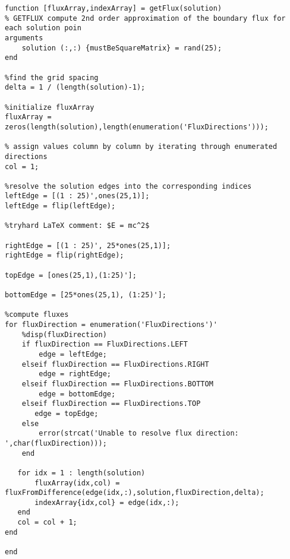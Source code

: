 \documentclass[twocolumn]{article}
\begin{document}
\begin{verbatim}
function [fluxArray,indexArray] = getFlux(solution)
% GETFLUX compute 2nd order approximation of the boundary flux for each solution poin
arguments
    solution (:,:) {mustBeSquareMatrix} = rand(25);
end

%find the grid spacing
delta = 1 / (length(solution)-1); 

%initialize fluxArray
fluxArray = zeros(length(solution),length(enumeration('FluxDirections')));

% assign values column by column by iterating through enumerated directions
col = 1;

%resolve the solution edges into the corresponding indices
leftEdge = [(1 : 25)',ones(25,1)];
leftEdge = flip(leftEdge);

%tryhard LaTeX comment: $E = mc^2$

rightEdge = [(1 : 25)', 25*ones(25,1)];
rightEdge = flip(rightEdge);

topEdge = [ones(25,1),(1:25)'];

bottomEdge = [25*ones(25,1), (1:25)'];

%compute fluxes
for fluxDirection = enumeration('FluxDirections')'
    %disp(fluxDirection)
    if fluxDirection == FluxDirections.LEFT
        edge = leftEdge;
    elseif fluxDirection == FluxDirections.RIGHT
        edge = rightEdge;
    elseif fluxDirection == FluxDirections.BOTTOM
        edge = bottomEdge;
    elseif fluxDirection == FluxDirections.TOP
       edge = topEdge;
    else
        error(strcat('Unable to resolve flux direction: ',char(fluxDirection)));
    end
    
   for idx = 1 : length(solution)
       fluxArray(idx,col) = fluxFromDifference(edge(idx,:),solution,fluxDirection,delta);
       indexArray{idx,col} = edge(idx,:);
   end
   col = col + 1;
end

end

\end{verbatim}
\end{document}
